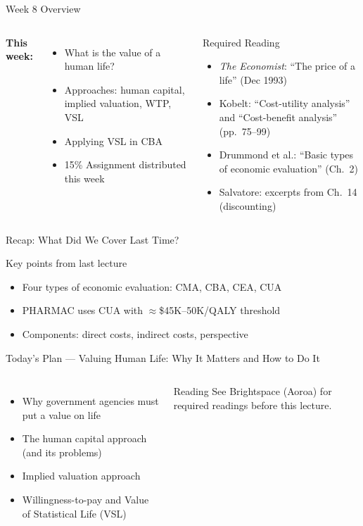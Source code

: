 \documentclass[aspectratio=169, 12pt]{beamer}
\newcommand{\recapslide}[1]{%
  \begin{frame}{Recap: What Did We Cover Last Time?}
    \begin{block}{Key points from last lecture}
      \begin{itemize}#1\end{itemize}
    \end{block}
  \end{frame}}
\newcommand{\planslide}[2]{%
  \begin{frame}{Today's Plan — #1}
    \begin{columns}
      \column{0.6\textwidth}
      \begin{itemize}#2\end{itemize}
      \column{0.38\textwidth}
      \begin{alertblock}{Reading}
        \footnotesize See Brightspace (Aoroa) for required readings before this lecture.
      \end{alertblock}
    \end{columns}
  \end{frame}}
\begin{document}
\begin{frame}{Week 8 Overview}
  \begin{columns}
      \textbf{This week:}
      \begin{itemize}
        \item What is the value of a human life?
        \item Approaches: human capital, implied valuation, WTP, VSL
        \item Applying VSL in CBA
        \item \alert{15\% Assignment distributed this week}
      \end{itemize}
      \begin{block}{Required Reading}
        {\small
        \begin{itemize}
          \item \textit{The Economist}: ``The price of a life'' (Dec 1993)
          \item Kobelt: ``Cost-utility analysis'' and ``Cost-benefit analysis'' (pp.\ 75--99)
          \item Drummond et al.: ``Basic types of economic evaluation'' (Ch.\ 2)
          \item Salvatore: excerpts from Ch.\ 14 (discounting)
        \end{itemize}}
      \end{block}
  \end{columns}
\end{frame}

\recapslide{
  \item Four types of economic evaluation: CMA, CBA, CEA, CUA
  \item PHARMAC uses CUA with $\approx$\$45K--50K/QALY threshold
  \item Components: direct costs, indirect costs, perspective
}

\planslide{Valuing Human Life: Why It Matters and How to Do It}{
  \item Why government agencies must put a value on life
  \item The human capital approach (and its problems)
  \item Implied valuation approach
  \item Willingness-to-pay and Value of Statistical Life (VSL)
}
\end{document}
